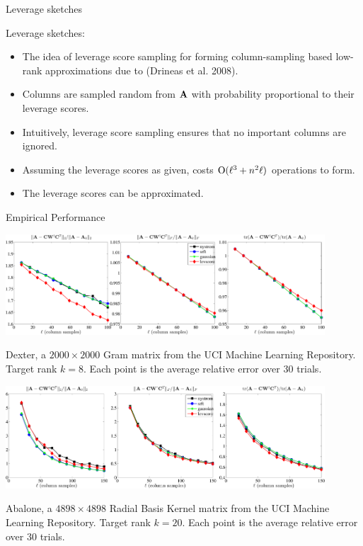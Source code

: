 \documentclass[xcolor=x11names,compress,ignorenonframetext]{beamer}
\renewcommand{\(}{\begin{columns}}
\renewcommand{\)}{\end{columns}}
\newcommand{\<}[1]{\begin{column}{#1}}
\renewcommand{\>}{\end{column}}
\def\refcolor{DodgerBlue4}
\newcommand{\refer}[1]{({\color{\refcolor}#1})}
\begin{document}
\begin{frame}{Leverage sketches}

Leverage sketches:
 \begin{itemize}
 \item The idea of leverage score sampling for forming column-sampling based low-rank approximations due to \refer{Drineas et al. 2008}.
  \item Columns are sampled random from $\mathbf{A}$ with probability proportional to their leverage scores.
  \item Intuitively, leverage score sampling ensures that no important columns are ignored.
  \item Assuming the leverage scores as given, costs $\mathrm{O}(\ell^3 + n^2 \ell)$ operations to form.
  \item The leverage scores can be approximated.
 \end{itemize}

\end{frame}

\begin{frame}{Empirical Performance}

\centerline{\includegraphics[width=4.7in, keepaspectratio=true]{Dexterrank8exact-methods-nonfixed-rank-errors}}

 Dexter, a $2000 \times 2000$ Gram matrix from the UCI Machine Learning Repository. 
 Target rank $k= 8.$ Each point is the average relative error over 30 trials.
\end{frame}

\begin{frame}

\centerline{\includegraphics[width=4.7in, keepaspectratio=true]{Abalonesigma1exact-methods-nonfixed-rank-errors}}

 Abalone, a $4898 \times 4898$ Radial Basis Kernel matrix from the UCI Machine Learning Repository. 
 Target rank $k= 20.$ Each point is the average relative error over 30 trials.
\end{frame}
\end{document}
